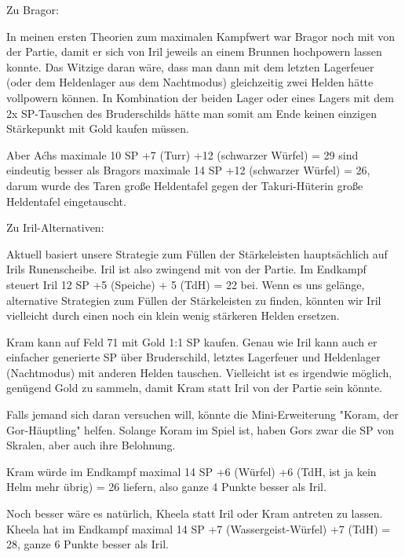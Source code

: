 \documentclass[10pt, a4paper, oneside]{book}
\begin{document}
{Zu Bragor:



In meinen ersten Theorien zum maximalen Kampfwert war Bragor noch mit von der Partie, damit er sich von Iril jeweils an einem Brunnen hochpowern lassen konnte. Das Witzige daran wäre, dass man dann mit dem letzten Lagerfeuer (oder dem Heldenlager aus dem Nachtmodus) gleichzeitig zwei Helden hätte vollpowern können. In Kombination der beiden Lager oder eines Lagers mit dem 2x SP-Tauschen des Bruderschilds hätte man somit am Ende keinen einzigen Stärkepunkt mit Gold kaufen müssen.

Aber Aćhs maximale 10 SP +7 (Turr) +12 (schwarzer Würfel) = 29 sind eindeutig besser als Bragors maximale 14 SP +12 (schwarzer Würfel) = 26, darum wurde des Taren große Heldentafel gegen der Takuri-Hüterin große Heldentafel eingetauscht.\bigskip







Zu Iril-Alternativen:



Aktuell basiert unsere Strategie zum Füllen der Stärkeleisten hauptsächlich auf Irils Runenscheibe. Iril ist also zwingend mit von der Partie. Im Endkampf steuert Iril 12 SP +5 (Speiche) + 5 (TdH) = 22 bei. Wenn es uns gelänge, alternative Strategien zum Füllen der Stärkeleisten zu finden, könnten wir Iril vielleicht durch einen noch ein klein wenig stärkeren Helden ersetzen.



Kram kann auf Feld 71 mit Gold 1:1 SP kaufen. Genau wie Iril kann auch er einfacher generierte SP über Bruderschild, letztes Lagerfeuer und Heldenlager (Nachtmodus) mit anderen Helden tauschen. Vielleicht ist es irgendwie möglich, genügend Gold zu sammeln, damit Kram statt Iril von der Partie sein könnte.

Falls jemand sich daran versuchen will, könnte die Mini-Erweiterung "Koram, der Gor-Häuptling" helfen. Solange Koram im Spiel ist, haben Gors zwar die SP von Skralen, aber auch ihre Belohnung.

Kram würde im Endkampf maximal 14 SP +6 (Würfel) +6 (TdH, ist ja kein Helm mehr übrig) = 26 liefern, also ganze 4 Punkte besser als Iril.



Noch besser wäre es natürlich, Kheela statt Iril oder Kram antreten zu lassen. Kheela hat im Endkampf maximal 14 SP +7 (Wassergeist-Würfel) +7 (TdH) = 28, ganze 6 Punkte besser als Iril.

}
\end{document}
